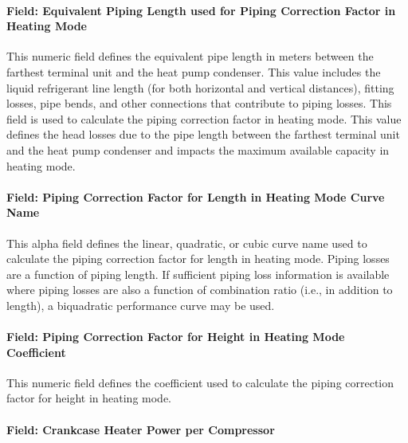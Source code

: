 \paragraph{Field: Equivalent Piping Length used for Piping Correction Factor in Heating Mode}\label{field-equivalent-piping-length-used-for-piping-correction-factor-in-heating-mode-000}

This numeric field defines the equivalent pipe length in meters between the farthest terminal unit and the heat pump condenser. This value includes the liquid refrigerant line length (for both horizontal and vertical distances), fitting losses, pipe bends, and other connections that contribute to piping losses. This field is used to calculate the piping correction factor in heating mode. This value defines the head losses due to the pipe length between the farthest terminal unit and the heat pump condenser and impacts the maximum available capacity in heating mode.

\paragraph{Field: Piping Correction Factor for Length in Heating Mode Curve Name}\label{field-piping-correction-factor-for-length-in-heating-mode-curve-name}

This alpha field defines the linear, quadratic, or cubic curve name used to calculate the piping correction factor for length in heating mode. Piping losses are a function of piping length. If sufficient piping loss information is available where piping losses are also a function of combination ratio (i.e., in addition to length), a biquadratic performance curve may be used.

\paragraph{Field: Piping Correction Factor for Height in Heating Mode Coefficient}\label{field-piping-correction-factor-for-height-in-heating-mode-coefficient}

This numeric field defines the coefficient used to calculate the piping correction factor for height in heating mode.

\paragraph{Field: Crankcase Heater Power per Compressor}\label{field-crankcase-heater-power-per-compressor-000}

